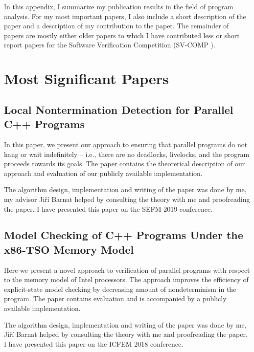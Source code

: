 In this appendix, I summarize my publication results in the field of program analysis.
For my most important papers, I also include a short description of the paper and a description of my contribution to the paper.
The remainder of papers are mostly either older papers to which I have contributed less or short report papers for the Software Verification Competition (SV-COMP \cite{Beyer2020svc}).

\section{Most Significant Papers}

\subsection*{Local Nontermination Detection for Parallel C++ Programs}

In this paper, we present our approach to ensuring that parallel programs do not hang or wait indefinitely – i.e., there are no deadlocks, livelocks, and the program proceeds towards its goals.
The paper contains the theoretical description of our approach and evaluation of our publicly available implementation.

The algorithm design, implementation and writing of the paper was done by me, my advisor Jiří Barnat helped by consulting the theory with me and proofreading the paper.
I have presented this paper on the SEFM 2019 conference.

\bigskip\noindent{}

\subsection*{Model Checking of C++ Programs Under the x86-TSO Memory Model}

Here we present a novel approach to verification of parallel programs with respect to the memory model of Intel processors.
The approach improves the efficiency of explicit-state model checking by decreasing amount of nondeterminism in the program.
The paper contains evaluation and is accompanied by a publicly available implementation.

The algorithm design, implementation and writing of the paper was done by me, Jiří Barnat helped by consulting the theory with me and proofreading the paper.
I have presented this paper on the ICFEM 2018 conference.

\bigskip\noindent{}

